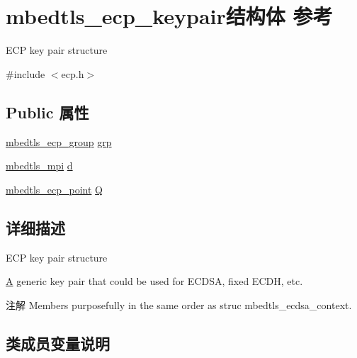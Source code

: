 \hypertarget{structmbedtls__ecp__keypair}{}\section{mbedtls\+\_\+ecp\+\_\+keypair结构体 参考}
\label{structmbedtls__ecp__keypair}


E\+CP key pair structure  




{\ttfamily \#include $<$ecp.\+h$>$}

\subsection*{Public 属性}
\begin{DoxyCompactItemize}
\item 
\hyperlink{structmbedtls__ecp__group}{mbedtls\+\_\+ecp\+\_\+group} \hyperlink{structmbedtls__ecp__keypair_ab5b77c1c63b7396b6869545b121d8828}{grp}
\item 
\hyperlink{structmbedtls__mpi}{mbedtls\+\_\+mpi} \hyperlink{structmbedtls__ecp__keypair_aa3d38ffe795a2953fb283644845087d6}{d}
\item 
\hyperlink{structmbedtls__ecp__point}{mbedtls\+\_\+ecp\+\_\+point} \hyperlink{structmbedtls__ecp__keypair_a30cb41708701bb9ed9bdba5972a2ccea}{Q}
\end{DoxyCompactItemize}


\subsection{详细描述}
E\+CP key pair structure 

\hyperlink{struct_a}{A} generic key pair that could be used for E\+C\+D\+SA, fixed E\+C\+DH, etc.

\begin{DoxyNote}{注解}
Members purposefully in the same order as struc mbedtls\+\_\+ecdsa\+\_\+context. 
\end{DoxyNote}


\subsection{类成员变量说明}
\mbox{\label{structmbedtls__ecp__keypair_aa3d38ffe795a2953fb283644845087d6}} 
